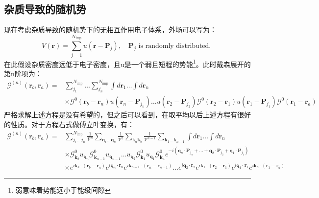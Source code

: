 \documentclass[10pt,openany]{book}
\theoremstyle{thmstyle} %
\theoremstyle{defstyle} %
\theoremstyle{prostyle} %
\begin{document}
\subsection*{杂质导致的随机势}
现在考虑杂质导致的随机势下的无相互作用电子体系，外场可以写为：
\begin{equation}
  V(\mathbf{r})=\sum_{j=1}^{N_{\mathrm{imp}}} u\left(\mathbf{r}-\mathbf{P}_j\right), \quad \mathbf{P}_j \text { is randomly distributed. }
\end{equation}
在此假设杂质密度远低于电子密度，且u是一个弱且短程的势能\footnote{弱意味着势能远小于能级间隙}。此时戴森展开的第n阶项为：
\begin{equation}
  \begin{aligned}
    \mathcal{G}^{(n)}\left(\mathbf{r}_b, \mathbf{r}_a\right)= & \sum_{j_1}^{N_{\mathrm{imp}}} \ldots \sum_{j_n}^{N_{\mathrm{imp}}} \int d \mathbf{r}_1 \ldots \int d \mathbf{r}_n \\
    & \times \mathcal{G}^0\left(\mathbf{r}_b-\mathbf{r}_n\right) u\left(\mathbf{r}_n-\mathbf{P}_{j_n}\right) \ldots u\left(\mathbf{r}_2-\mathbf{P}_{j_2}\right) \mathcal{G}^0\left(\mathbf{r}_2-\mathbf{r}_1\right) u\left(\mathbf{r}_1-\mathbf{P}_{j_1}\right) \mathcal{G}^0\left(\mathbf{r}_1-\mathbf{r}_a\right)
    \end{aligned}
\end{equation}
严格求解上述方程是没有希望的，但之后可以看到，在取平均以后上述方程有很好的性质。对于方程右式做傅立叶变换，有：
\begin{equation}
  \begin{aligned}
    \mathcal{G}^{(n)}\left(\mathbf{r}_b, \mathbf{r}_a\right)= & \sum_{j_1 \ldots j_n}^{N_{\mathrm{imp}}} \frac{1}{\mathcal{V}^n} \sum_{\mathbf{q}_1 \ldots \mathbf{q}_n} \frac{1}{\mathcal{V}^2} \sum_{\mathbf{k}_a \mathbf{k}_b} \frac{1}{\mathcal{V}^{n-1}} \sum_{\mathbf{k}_1 \ldots \mathbf{k}_{n-1}} \int d \mathbf{r}_1 \ldots \int d \mathbf{r}_n \\
    & \times \mathcal{G}_{\mathbf{k}_b}^0 u_{\mathbf{q}_n} \mathcal{G}_{\mathbf{k}_{n-1}}^0 u_{\mathbf{q}_{n-1}} \ldots u_{\mathbf{q}_2} \mathcal{G}_{\mathbf{k}_1}^0 u_{\mathbf{q}_1} \mathcal{G}_{\mathbf{k}_a}^0 e^{-i\left(\mathbf{q}_n \cdot \mathbf{P}_{j_n}+\ldots+\mathbf{q}_2 \cdot \mathbf{P}_{j_2}+\mathbf{q}_1 \cdot \mathbf{P}_{j_1}\right)} \\
    & \times e^{i \mathbf{k}_b \cdot\left(\mathbf{r}_b-\mathbf{r}_n\right)} e^{i \mathbf{q}_n \cdot \mathbf{r}_n} e^{i \mathbf{k}_{n-1} \cdot\left(\mathbf{r}_n-\mathbf{r}_{n-1}\right)} \ldots e^{i \mathbf{q}_2 \cdot \mathbf{r}_2} e^{i \mathbf{k}_1 \cdot\left(\mathbf{r}_2-\mathbf{r}_1\right)} e^{i \mathbf{q}_1 \cdot \mathbf{r}_1} e^{i \mathbf{k}_a \cdot\left(\mathbf{r}_1-\mathbf{r}_a\right)}
    \end{aligned}
\end{equation}
\end{document}
